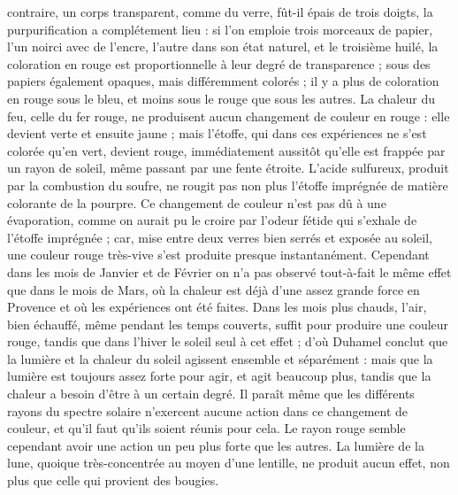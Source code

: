 \documentclass[a4paper, 11pt, oneside, polutonikogreek, french]{article}
\begin{document}
contraire, un corps transparent, comme du verre, fût-il épais de trois doigts, la purpurification a complétement lieu : si l'on emploie trois morceaux de papier, l'un noirci avec de l'encre, l'autre dans son état naturel, et le troisième huilé, la coloration en rouge est proportionnelle à leur degré de transparence ; sous des papiers également opaques, mais différemment colorés ; il y a plus de coloration en rouge sous le bleu, et moins sous le rouge que sous les autres. La chaleur du feu, celle du fer rouge, ne produisent aucun changement de couleur en rouge : elle devient verte et ensuite jaune ; mais l'étoffe, qui dans ces expériences ne s'est colorée qu'en vert, devient rouge, immédiatement aussitôt qu'elle est frappée par un rayon de soleil, même passant par une fente étroite. L'acide sulfureux, produit par la combustion du soufre, ne rougit pas non plus l'étoffe imprégnée de matière colorante de la pourpre. Ce changement de couleur n'est pas dû à une évaporation, comme on aurait pu le croire par l'odeur fétide qui s'exhale de l'étoffe imprégnée ; car, mise entre deux verres bien serrés et exposée au soleil, une couleur rouge très-vive s'est produite presque instantanément. Cependant dans les mois de Janvier et de Février on n'a pas observé tout-à-fait le même effet que dans le mois de Mars, où la chaleur est déjà d'une assez grande force en Provence et où les expériences ont été faites. Dans les mois plus chauds, l'air, bien échauffé, même pendant les temps couverts, suffit pour produire une couleur rouge, tandis que dans l'hiver le soleil seul à cet effet ; d'où Duhamel conclut que la lumière et la chaleur du soleil agissent ensemble et séparément : mais que la lumière est toujours assez forte pour agir, et agit beaucoup plus, tandis que la chaleur a besoin d'être à un certain degré. Il paraît même que les différents rayons du spectre solaire n'exercent aucune action dans ce changement de couleur, et qu'il faut qu'ils soient réunis pour cela. Le rayon rouge semble cependant avoir une action un peu plus forte que les autres. La lumière de la lune, quoique très-concentrée au moyen d'une lentille, ne produit aucun effet, non plus que celle qui provient des bougies.
\end{document}

